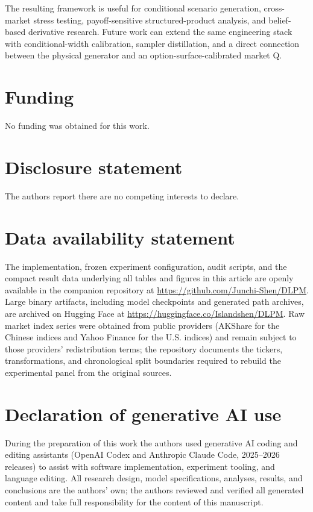 ﻿\documentclass[12pt,letterpaper]{article}
\begin{document}
The resulting framework is useful for conditional scenario generation,
cross-market stress testing, payoff-sensitive structured-product analysis, and
belief-based derivative research. Future work can extend the same engineering
stack with conditional-width calibration, sampler distillation, and a direct
connection between the physical generator and an option-surface-calibrated
market Q.

\section*{Funding}
No funding was obtained for this work.

\section*{Disclosure statement}
The authors report there are no competing interests to declare.

\section*{Data availability statement}
The implementation, frozen experiment configuration, audit scripts, and the
compact result data underlying all tables and figures in this article are
openly available in the companion repository at
\url{https://github.com/Junchi-Shen/DLPM}. Large binary artifacts, including
model checkpoints and generated path archives, are archived on Hugging Face
at \url{https://huggingface.co/Islandshen/DLPM}. Raw market index series
were obtained from public providers (AKShare for the Chinese indices and
Yahoo Finance for the U.S. indices) and remain subject to those providers'
redistribution terms; the repository documents the tickers, transformations,
and chronological split boundaries required to rebuild the experimental
panel from the original sources.

\section*{Declaration of generative AI use}
During the preparation of this work the authors used generative AI coding
and editing assistants (OpenAI Codex and Anthropic Claude Code, 2025--2026
releases) to assist with software implementation, experiment tooling, and
language editing. All research design, model specifications, analyses,
results, and conclusions are the authors' own; the authors reviewed and
verified all generated content and take full responsibility for the
content of this manuscript.
\end{document}
